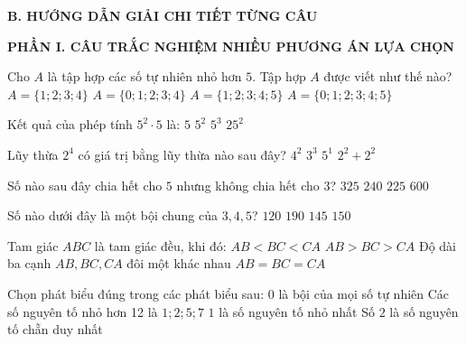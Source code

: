 \documentclass[12pt,a4paper]{article}
\begin{document}
\noindent\textbf{\large B. HƯỚNG DẪN GIẢI CHI TIẾT TỪNG CÂU}
\vspace{2mm}

\noindent\textbf{\large PHẦN I. CÂU TRẮC NGHIỆM NHIỀU PHƯƠNG ÁN LỰA CHỌN}
\vspace{1mm}
\begin{ex}
Cho $A$ là tập hợp các số tự nhiên nhỏ hơn $5$. Tập hợp $A$ được viết như thế nào?
\choice
{$A = \{1; 2; 3; 4\}$}
{\True $A = \{0; 1; 2; 3; 4\}$}
{$A = \{1; 2; 3; 4; 5\}$}
{$A = \{0; 1; 2; 3; 4; 5\}$}
\end{ex}

\begin{ex}
Kết quả của phép tính $5^2 \cdot 5$ là:
\choice
{$5$}
{$5^2$}
{\True $5^3$}
{$25^2$}
\end{ex}

\begin{ex}
Lũy thừa $2^4$ có giá trị bằng lũy thừa nào sau đây?
\choice
{\True $4^2$}
{$3^3$}
{$5^1$}
{$2^2 + 2^2$}
\end{ex}

\begin{ex}
Số nào sau đây chia hết cho $5$ nhưng không chia hết cho $3$?
\choice
{\True $325$}
{$240$}
{$225$}
{$600$}
\end{ex}

\begin{ex}
Số nào dưới đây là một bội chung của $3, 4, 5$?
\choice
{\True $120$}
{$190$}
{$145$}
{$150$}
\end{ex}

\begin{ex}
Tam giác $ABC$ là tam giác đều, khi đó:
\choice
{$AB < BC < CA$}
{$AB > BC > CA$}
{Độ dài ba cạnh $AB, BC, CA$ đôi một khác nhau}
{\True $AB = BC = CA$}
\end{ex}

\begin{ex}
Chọn phát biểu đúng trong các phát biểu sau:
\choice
{$0$ là bội của mọi số tự nhiên}
{Các số nguyên tố nhỏ hơn 12 là $1; 2; 5; 7$}
{$1$ là số nguyên tố nhỏ nhất}
{\True Số $2$ là số nguyên tố chẵn duy nhất}
\end{ex}
\end{document}
